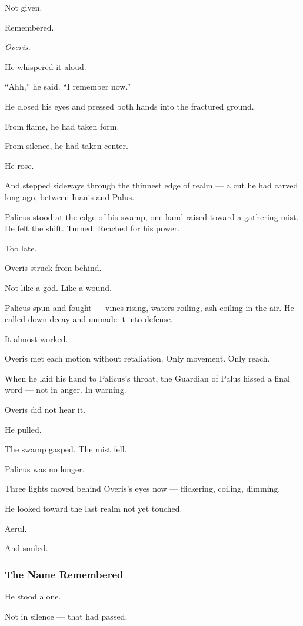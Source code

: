 \documentclass[12pt]{article}
\begin{document}
Not given.

Remembered.

\emph{Overis.}

He whispered it aloud.

``Ahh,'' he said. ``I remember now.''

He closed his eyes and pressed both hands into the fractured ground.

From flame, he had taken form.

From silence, he had taken center.

He rose.

And stepped sideways through the thinnest edge of realm — a cut he had carved long ago, between Inanis and Palus.

Palicus stood at the edge of his swamp, one hand raised toward a gathering mist. He felt the shift. Turned. Reached for his power.

Too late.

Overis struck from behind.

Not like a god. Like a wound.

Palicus spun and fought — vines rising, waters roiling, ash coiling in the air. He called down decay and unmade it into defense.

It almost worked.

Overis met each motion without retaliation. Only movement. Only reach.

When he laid his hand to Palicus’s throat, the Guardian of Palus hissed a final word — not in anger. In warning.

Overis did not hear it.

He pulled.

The swamp gasped. The mist fell.

Palicus was no longer.

Three lights moved behind Overis’s eyes now — flickering, coiling, dimming.

He looked toward the last realm not yet touched.

Aerul.

And smiled.

\dotfill

\subsubsection{The Name Remembered}

He stood alone.

Not in silence — that had passed.
\end{document}
